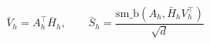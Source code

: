 \documentclass{article}
\begin{document}
\begin{preview}

\[ \bar V_h = A_h^\top \bar H_h,\qquad \bar S_h = \dfrac{\mathrm{sm\_b}(A_h, \bar H_h V_h^\top)}{\sqrt d} \]

\end{preview}
\end{document}
